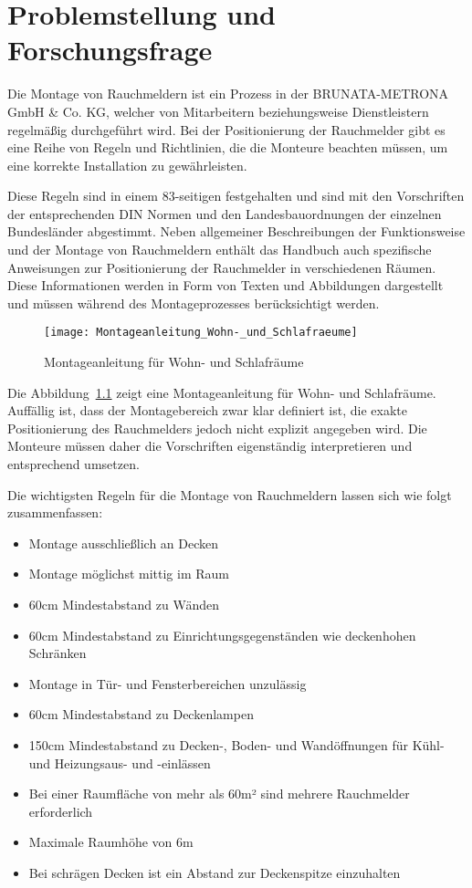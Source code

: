 \chapter{Problemstellung und Forschungsfrage} \label{cha:Problemstellung}

Die Montage von Rauchmeldern ist ein Prozess in der BRUNATA-METRONA GmbH \& Co. KG, welcher von Mitarbeitern beziehungsweise Dienstleistern regelmäßig durchgeführt wird. Bei der Positionierung der Rauchmelder gibt es eine Reihe von Regeln und Richtlinien, die die Monteure beachten müssen, um eine korrekte Installation zu gewährleisten. 

Diese Regeln sind in einem 83-seitigen \citet{brunata2023handbuch} festgehalten und sind mit den Vorschriften der entsprechenden DIN Normen und den Landesbauordnungen der einzelnen Bundesländer abgestimmt. Neben allgemeiner Beschreibungen der Funktionsweise und der Montage von Rauchmeldern enthält das Handbuch auch spezifische Anweisungen zur Positionierung der Rauchmelder in verschiedenen Räumen. Diese Informationen werden in Form von Texten und Abbildungen dargestellt und müssen während des Montageprozesses berücksichtigt werden.


\begin{figure}
\centering
\texttt{[image: Montageanleitung\_Wohn-\_und\_Schlafraeume]}
\caption{Montageanleitung für Wohn- und Schlafräume \cite{brunata2023handbuch}\label{fig:Anleitung}}\par
\end{figure}

Die Abbildung~\ref{fig:Anleitung} zeigt eine Montageanleitung für Wohn- und Schlafräume. Auffällig ist, dass der Montagebereich zwar klar definiert ist, die exakte Positionierung des Rauchmelders jedoch nicht explizit angegeben wird. Die Monteure müssen daher die Vorschriften eigenständig interpretieren und entsprechend umsetzen.

Die wichtigsten Regeln für die Montage von Rauchmeldern lassen sich wie folgt zusammenfassen:

\begin{itemize}
    \item Montage ausschließlich an Decken
    \item Montage möglichst mittig im Raum
    \item 60cm Mindestabstand zu Wänden
    \item 60cm Mindestabstand zu Einrichtungsgegenständen wie deckenhohen Schränken
    \item Montage in Tür- und Fensterbereichen unzulässig
    \item 60cm Mindestabstand zu Deckenlampen
    \item 150cm Mindestabstand zu Decken-, Boden- und Wandöffnungen für Kühl- und Heizungsaus- und -einlässen 
    \item Bei einer Raumfläche von mehr als 60m² sind mehrere Rauchmelder erforderlich
    \item Maximale Raumhöhe von 6m
    \item Bei schrägen Decken ist ein Abstand zur Deckenspitze einzuhalten
\end{itemize}


